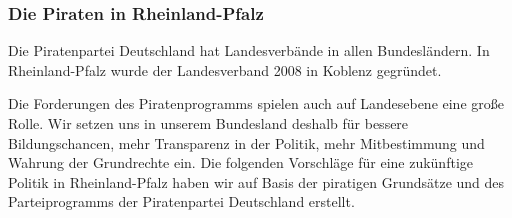 \subsubsection{Die Piraten in Rheinland-Pfalz}
\abstimmung
Die Piratenpartei Deutschland hat Landesverbände in allen Bundesländern. In Rheinland-Pfalz wurde der Landesverband 2008 in Koblenz gegründet.

Die Forderungen des Piratenprogramms spielen auch auf Landesebene eine große Rolle. Wir setzen uns in unserem Bundesland deshalb für bessere Bildungschancen, mehr Transparenz in der Politik, mehr Mitbestimmung und Wahrung der Grundrechte ein.
Die folgenden Vorschläge für eine zukünftige Politik in Rheinland-Pfalz haben wir auf Basis der piratigen Grundsätze und des Parteiprogramms der Piratenpartei Deutschland erstellt.
